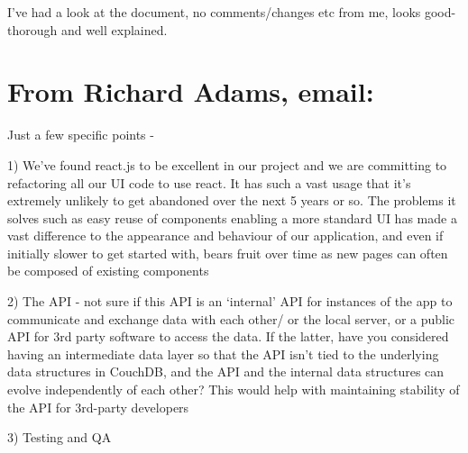 \documentclass[a4paper,headings=small fontsize=10pt]{scrreprt}
\begin{document}
I've had a look at the document, no comments/changes etc from me, looks
good- thorough and well explained.

\section{From Richard Adams, email:}

Just a few specific points -

1) We've found react.js to be excellent in our project and we are
committing to refactoring all our UI code to use react. It has such a
vast usage that it's extremely unlikely to get abandoned over the next 5
years or so. The problems it solves such as easy reuse of components
enabling a more standard UI has made a vast difference to the appearance
and behaviour of our application, and even if initially slower to get
started with, bears fruit over time as new pages can often be composed
of existing components

2) The API - not sure if this API is an `internal' API for instances of
the app to communicate and exchange data with each other/ or the local
server, or a public API for 3rd party software to access the data. If
the latter, have you considered having an intermediate data layer so
that the API isn't tied to the underlying data structures in CouchDB,
and the API and the internal data structures can evolve independently of
each other? This would help with maintaining stability of the API for
3rd-party developers

3) Testing and QA
\end{document}
